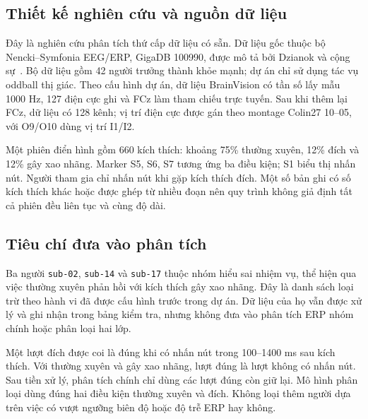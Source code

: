 \documentclass[11pt,a4paper]{article}
\newcommand{\code}[1]{\nolinkurl{#1}}
\begin{document}
\subsection{Thiết kế nghiên cứu và nguồn dữ liệu}
Đây là nghiên cứu phân tích thứ cấp dữ liệu có sẵn. Dữ liệu gốc thuộc bộ Nencki--Symfonia EEG/ERP, GigaDB 100990, được mô tả bởi Dzianok và cộng sự~\cite{dataset}. Bộ dữ liệu gồm 42 người trưởng thành khỏe mạnh; dự án chỉ sử dụng tác vụ oddball thị giác. Theo cấu hình dự án, dữ liệu BrainVision có tần số lấy mẫu 1000 Hz, 127 điện cực ghi và FCz làm tham chiếu trực tuyến. Sau khi thêm lại FCz, dữ liệu có 128 kênh; vị trí điện cực được gán theo montage Colin27 10--05, với O9/O10 dùng vị trí I1/I2.

Một phiên điển hình gồm 660 kích thích: khoảng 75\% thường xuyên, 12\% đích và 12\% gây xao nhãng. Marker S5, S6, S7 tương ứng ba điều kiện; S1 biểu thị nhấn nút. Người tham gia chỉ nhấn nút khi gặp kích thích đích. Một số bản ghi có số kích thích khác hoặc được ghép từ nhiều đoạn nên quy trình không giả định tất cả phiên đều liên tục và cùng độ dài.

\subsection{Tiêu chí đưa vào phân tích}
Ba người \code{sub-02}, \code{sub-14} và \code{sub-17} thuộc nhóm hiểu sai nhiệm vụ, thể hiện qua việc thường xuyên phản hồi với kích thích gây xao nhãng. Đây là danh sách loại trừ theo hành vi đã được cấu hình trước trong dự án. Dữ liệu của họ vẫn được xử lý và ghi nhận trong bảng kiểm tra, nhưng không đưa vào phân tích ERP nhóm chính hoặc phân loại hai lớp.

Một lượt đích được coi là đúng khi có nhấn nút trong 100--1400 ms sau kích thích. Với thường xuyên và gây xao nhãng, lượt đúng là lượt không có nhấn nút. Sau tiền xử lý, phân tích chính chỉ dùng các lượt đúng còn giữ lại. Mô hình phân loại dùng đúng hai điều kiện thường xuyên và đích. Không loại thêm người dựa trên việc có vượt ngưỡng biên độ hoặc độ trễ ERP hay không.
\end{document}
